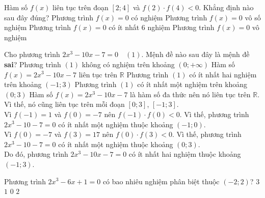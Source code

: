 \begin{ex}%
Hàm số $f(x)$ liên tục trên đoạn $[2 ; 4]$ và $f(2) \cdot f(4)<0$. Khẳng định nào sau đây đúng?
\choice
{\True Phương trình $f(x)=0$ có nghiệm}
{Phương trình $f(x)=0$ vô số nghiệm}
{Phương trình $f(x)=0$ có ít nhất $6$ nghiệm}
{Phương trình $f(x)=0$ vô nghiệm}
\end{ex}

\begin{ex}%
Cho phương trình $2x^3-10x-7=0\quad (1)$. Mệnh đề nào sau đây là mệnh đề \textbf{sai}?
\choice
{\True Phương trình $(1)$ không có nghiệm trên khoảng $(0;+\infty)$}
{Hàm số $f(x)=2x^3-10x-7$ liên tục trên $\mathbb{R}$}
{Phương trình $(1)$ có ít nhất hai nghiệm trên khoảng $(-1;3)$}
{Phương trình $(1)$ có ít nhất một nghiệm trên khoảng $(0;3)$}
\loigiai
{
Hàm số $f(x)=2x^3-10x-7$ là hàm số đa thức nên nó liên tục trên $\mathbb{R}$. Vì thế, nó cũng liên tục trên mỗi đoạn $[0;3]$, $[-1;3]$.\\
Vì $f(-1)=1$ và $f(0)=-7$ nên $f(-1)\cdot f(0)<0$. Vì thế, phương trình $2x^3-10-7=0$ có ít nhất một nghiệm thuộc khoảng $(-1;0)$.\\
Vì $f(0)=-7$ và $f(3)=17$ nên $f(0)\cdot f(3)<0$. Vì thế, phương trình $2x^3-10-7=0$ có ít nhất một nghiệm thuộc khoảng $(0;3)$.\\
Do đó, phương trình $2x^3-10x-7=0$ có ít nhất hai nghiệm thuộc khoảng $(-1;3)$.
}
\end{ex}

\begin{ex}%
Phương trình $2x^3-6x+1=0$ có bao nhiêu nghiệm phân biệt thuộc $(-2;2)$?
\choice 
{\True $3$}
{$1$}
{$0$}
{$2$}
\end{ex}


